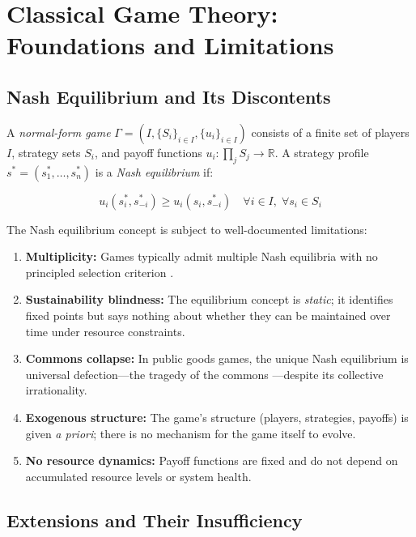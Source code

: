 \documentclass[12pt,a4paper,twocolumn]{article}
\newcommand{\R}{\mathbb{R}}
\begin{document}
\section{Classical Game Theory: Foundations and Limitations}
\label{sec:gametheory}

\subsection{Nash Equilibrium and Its Discontents}

A \emph{normal-form game} $\Gamma = (I, \{S_i\}_{i \in I}, \{u_i\}_{i \in I})$ consists of a finite set of players $I$, strategy sets $S_i$, and payoff functions $u_i: \prod_j S_j \to \R$.
A strategy profile $s^* = (s_1^*, \ldots, s_n^*)$ is a \emph{Nash equilibrium} if:

\begin{equation}
\label{eq:nash}
u_i(s_i^*, s_{-i}^*) \geq u_i(s_i, s_{-i}^*) \quad \forall i \in I,\; \forall s_i \in S_i
\end{equation}

The Nash equilibrium concept is subject to well-documented limitations:

\begin{enumerate}[nosep,label=(\roman*)]
  \item \textbf{Multiplicity:} Games typically admit multiple Nash equilibria with no principled selection criterion \citep{Harsanyi1988}.
  \item \textbf{Sustainability blindness:} The equilibrium concept is \emph{static}; it identifies fixed points but says nothing about whether they can be maintained over time under resource constraints.
  \item \textbf{Commons collapse:} In public goods games, the unique Nash equilibrium is universal defection---the tragedy of the commons \citep{Hardin1968}---despite its collective irrationality.
  \item \textbf{Exogenous structure:} The game's structure (players, strategies, payoffs) is given \emph{a priori}; there is no mechanism for the game itself to evolve.
  \item \textbf{No resource dynamics:} Payoff functions are fixed and do not depend on accumulated resource levels or system health.
\end{enumerate}

\subsection{Extensions and Their Insufficiency}
\end{document}
